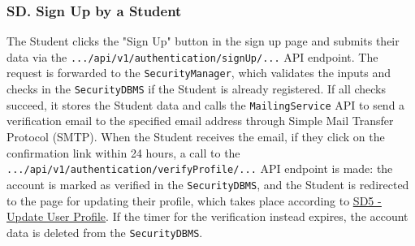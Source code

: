 \setcounter{uc}{1}
\newcommand{\cuc}{\theuc{}}

\subsubsection*{SD\cuc. Sign Up by a Student}
\label{subsubsec:signup_student_sd}
The Student clicks the "Sign Up" button in the sign up page and submits their data via the \texttt{.../api/v1/authentication/signUp/...} API endpoint. The request is forwarded to the \texttt{SecurityManager}, which validates the inputs and checks in the \texttt{SecurityDBMS} if the Student is already registered. If all checks succeed, it stores the Student data and calls the \texttt{MailingService} API to send a verification email to the specified email address through Simple Mail Transfer Protocol (SMTP). When the Student receives the email, if they click on the confirmation link within 24 hours, a call to the \texttt{.../api/v1/authentication/verifyProfile/...} API endpoint is made: the account is marked as verified in the \texttt{SecurityDBMS}, and the Student is redirected to the page for updating their profile, which takes place according to \hyperref[fig:update_profile_sd]{\protect\uline{SD5 - Update User Profile}}. If the timer for the verification instead expires, the account data is deleted from the \texttt{SecurityDBMS}.

\newpage

